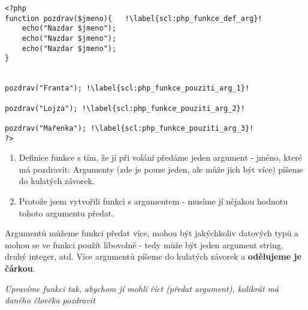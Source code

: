 \begin{minipage}[t]{.45\textwidth}
\begin{code}
\begin{verbatim}
<?php
function pozdrav($jmeno){	!\label{scl:php_funkce_def_arg}!
	echo("Nazdar $jmeno");
	echo("Nazdar $jmeno");
	echo("Nazdar $jmeno");
}
	
	
pozdrav("Franta"); !\label{scl:php_funkce_pouziti_arg_1}!

pozdrav("Lojza"); !\label{scl:php_funkce_pouziti_arg_2}!

pozdrav("Mařenka"); !\label{scl:php_funkce_pouziti_arg_3}!
?>
\end{verbatim}

\label{code:php_funkce_arg}
\end{code}
\end{minipage}
\begin{minipage}[t]{.45\textwidth}
\begin{enumerate}
\item[ř. \ref{scl:php_funkce_def_arg}:] Definice funkce s tím, že jí při volání předáme jeden argument - jméno, které má pozdravit: Argumenty (zde je pouze jeden, ale může jich být více) píšeme do kulatých závorek.
\item[ř. \ref{scl:php_funkce_pouziti_arg_1}, \ref{scl:php_funkce_pouziti_arg_2}, \ref{scl:php_funkce_pouziti_arg_3}:] Protože jsem vytvořili funkci s argumentem - musíme jí nějakou hodnotu tohoto argumentu předat.
\end{enumerate}
\end{minipage}

Argumentů můžeme funkci předat více, mohou být jakýchkoliv datových typů a mohou se ve funkci použít libovolně - tedy může být jeden argument string, druhý integer, atd. Více argumentů píšeme do kulatých závorek a \textbf{odělujeme je čárkou}.

\vspace{1cm}
\textit{Upravíme funkci tak, abychom jí mohli říct (předat argument), kolikrát má daného člověka pozdravit}\\

